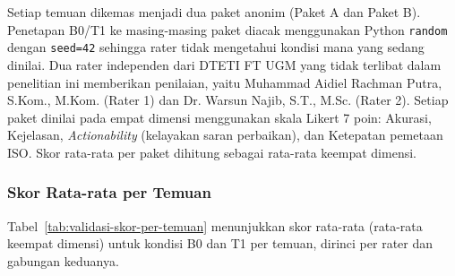 Setiap temuan dikemas menjadi dua paket anonim (Paket A dan Paket
B). Penetapan B0/T1 ke masing-masing paket diacak menggunakan
Python \texttt{random} dengan \texttt{seed=42} sehingga rater tidak
mengetahui kondisi mana yang sedang dinilai. Dua rater independen
dari DTETI FT UGM yang tidak terlibat dalam penelitian ini
memberikan penilaian, yaitu Muhammad Aidiel Rachman Putra, S.Kom.,
M.Kom. (Rater 1) dan Dr. Warsun Najib, S.T., M.Sc. (Rater 2).
Setiap paket dinilai pada empat dimensi menggunakan skala Likert 7
poin: Akurasi, Kejelasan, \textit{Actionability} (kelayakan saran
perbaikan), dan Ketepatan pemetaan ISO. Skor rata-rata per paket
dihitung sebagai rata-rata keempat dimensi.

\subsubsection{Skor Rata-rata per Temuan}

Tabel~\ref{tab:validasi-skor-per-temuan} menunjukkan skor rata-rata
(rata-rata keempat dimensi) untuk kondisi B0 dan T1 per temuan,
dirinci per rater dan gabungan keduanya.

